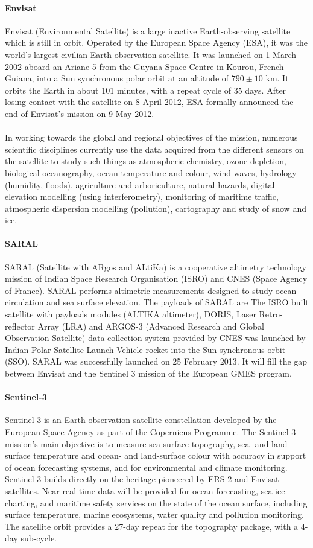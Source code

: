  \paragraph{Envisat}
Envisat (Environmental Satellite) is a large inactive Earth-observing satellite which is still in orbit. Operated by the European Space Agency (ESA), it was the world's largest civilian Earth observation satellite. It was launched on 1 March 2002 aboard an Ariane 5 from the Guyana Space Centre in Kourou, French Guiana, into a Sun synchronous polar orbit at an altitude of $790\pm10$ km. It orbits the Earth in about 101 minutes, with a repeat cycle of 35 days. After losing contact with the satellite on 8 April 2012, ESA formally announced the end of Envisat's mission on 9 May 2012.\\\\
In working towards the global and regional objectives of the mission, numerous scientific disciplines currently use the data acquired from the different sensors on the satellite to study such things as atmospheric chemistry, ozone depletion, biological oceanography, ocean temperature and colour, wind waves, hydrology (humidity, floods), agriculture and arboriculture, natural hazards, digital elevation modelling (using interferometry), monitoring of maritime traffic, atmospheric dispersion modelling (pollution), cartography and study of snow and ice.
\paragraph{SARAL}
SARAL (Satellite with ARgos and ALtiKa) is a cooperative altimetry technology mission of Indian Space Research Organisation (ISRO) and CNES (Space Agency of France). SARAL performs altimetric measurements designed to study ocean circulation and sea surface elevation. The payloads of SARAL are The ISRO built satellite with payloads modules (ALTIKA altimeter), DORIS, Laser Retro-reflector Array (LRA) and ARGOS-3 (Advanced Research and Global Observation Satellite) data collection system provided by CNES was launched by Indian Polar Satellite Launch Vehicle rocket into the Sun-synchronous orbit (SSO). SARAL was successfully launched on 25 February 2013. It will fill the gap between Envisat and the Sentinel 3 mission of the European GMES program.
\paragraph{Sentinel-3}
Sentinel-3 is an Earth observation satellite constellation developed by the European Space Agency as part of the Copernicus Programme. The Sentinel-3 mission's main objective is to measure sea-surface topography, sea- and land-surface temperature and ocean- and land-surface colour with accuracy in support of ocean forecasting systems, and for environmental and climate monitoring. Sentinel-3 builds directly on the heritage pioneered by ERS-2 and Envisat satellites. Near-real time data will be provided for ocean forecasting, sea-ice charting, and maritime safety services on the state of the ocean surface, including surface temperature, marine ecosystems, water quality and pollution monitoring. The satellite orbit provides a 27-day repeat for the topography package, with a 4-day sub-cycle.
\clearpage
